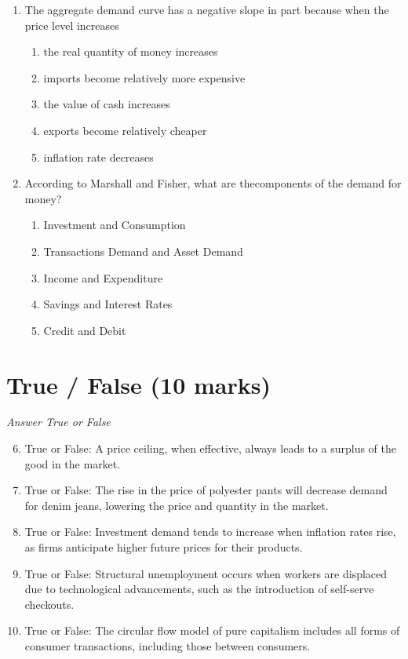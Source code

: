 \documentclass[12pt]{article}
\begin{document}
\begin{enumerate}[label=\arabic*.]
\begin{enumerate}[label=(\alph*)]
    \item A bumper crop of oranges in Florida
\end{enumerate}
\item The aggregate demand curve has a negative slope in part because when the price level increases
\begin{enumerate}[label=(\alph*)]
    \item the real quantity of money increases
    \item imports become relatively more expensive
    \item the value of cash increases
    \item exports become relatively cheaper
    \item inflation rate decreases
\end{enumerate}
\item According to Marshall and Fisher, what are thecomponents of the demand for money?
\begin{enumerate}[label=(\alph*)]
    \item Investment and Consumption
    \item Transactions Demand and Asset Demand
    \item Income and Expenditure
    \item Savings and Interest Rates
    \item Credit and Debit
\end{enumerate}
\end{enumerate}

\section*{True / False (10 marks)}
\textit{Answer True or False}
\begin{enumerate}[label=\arabic*.]
\setcounter{enumi}{5}
\item True or False: A price ceiling, when effective, always leads to a surplus of the good in the market.
\item True or False: The rise in the price of polyester pants will decrease demand for denim jeans, lowering the price and quantity in the market.
\item True or False: Investment demand tends to increase when inflation rates rise, as firms anticipate higher future prices for their products.
\item True or False: Structural unemployment occurs when workers are displaced due to technological advancements, such as the introduction of self-serve checkouts.
\item True or False: The circular flow model of pure capitalism includes all forms of consumer transactions, including those between consumers.
\end{enumerate}
\end{document}
